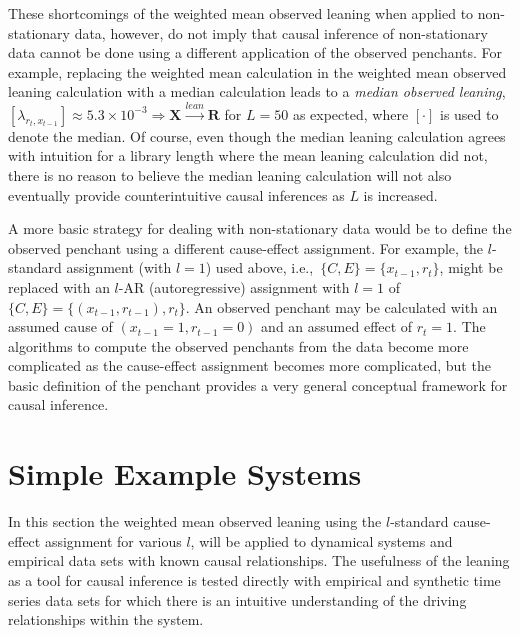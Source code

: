 \documentclass[twocolumn,aps,pre,groupedaddress]{revtex4-1}
\begin{document}
These shortcomings of the weighted mean observed leaning when applied to non-stationary data, however, do not imply that causal inference of non-stationary data cannot be done using a different application of the observed penchants.  For example, replacing the weighted mean calculation in the weighted mean observed leaning calculation with a median calculation leads to a {\em median observed leaning}, $[\lambda_{r_t,x_{t-1}}] \approx 5.3\times 10^{-3}\Rightarrow \mathbf{X}\xrightarrow{lean}\mathbf{R}$ for $L=50$ as expected, where $[\cdot]$ is used to denote the median.  Of course, even though the median leaning calculation agrees with intuition for a library length where the mean leaning calculation did not, there is no reason to believe the median leaning calculation will not also eventually provide counterintuitive causal inferences as $L$ is increased.  

A more basic strategy for dealing with non-stationary data would be to define the observed penchant using a different cause-effect assignment.  For example, the $l$-standard assignment (with $l=1$) used above, i.e.,\ $\{C,E\}=\{x_{t-1},r_t\}$, might be replaced with an $l$-AR (autoregressive) assignment with $l=1$ of $\{C,E\}=\{(x_{t-1},r_{t-1}),r_t\}$.  An observed penchant may be calculated with an assumed cause of $(x_{t-1}=1,r_{t-1}=0)$ and an assumed effect of $r_t = 1$.  The algorithms to compute the observed penchants from the data become more complicated as the cause-effect assignment becomes more complicated, but the basic definition of the penchant provides a very general conceptual framework for causal inference.

\section{Simple Example Systems}
In this section the weighted mean observed leaning using the $l$-standard cause-effect assignment for various $l$, will be applied to dynamical systems and empirical data sets with known causal relationships.  The usefulness of the leaning as a tool for causal inference is tested directly with empirical and synthetic time series data sets for which there is an intuitive understanding of the driving relationships within the system.
\end{document}
